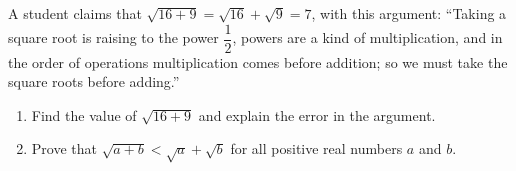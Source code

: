A student claims that $\sqrt{16+9}=\sqrt{16}+\sqrt{9}=7$, with this argument: ``Taking a square root is raising to the power $\dfrac{1}{2}$, powers are a kind of multiplication, and in the order of operations multiplication comes before addition; so we must take the square roots before adding.''
\begin{enumerate}
\item[(a)] Find the value of $\sqrt{16+9}$ and explain the error in the argument.
\item[(b)] Prove that $\sqrt{a+b}<\sqrt a+\sqrt b$ for all positive real numbers $a$ and $b$.
\end{enumerate}
